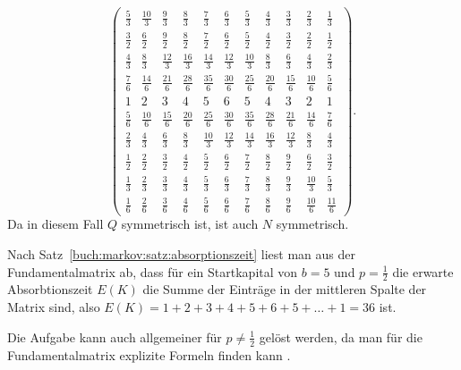 \begin{loesung}
\[\begin{pmatrix}
\frac{5}{3} &\frac{10}{3}&\frac{9}{3}&\frac{8}{3}&\frac{7}{3}&\frac{6}{3}&\frac{5}{3}&\frac{4}{3}&\frac{3}{3}&\frac{2}{3}&\frac{1}{3}\\
\frac{3}{2} & \frac{6}{2} & \frac{9}{2} & \frac{8}{2} & \frac{7}{2} & \frac{6}{2} & \frac{5}{2} & \frac{4}{2} & \frac{3}{2} & \frac{2}{2} & \frac{1}{2} \\
\frac{4}{3}&\frac{8}{3}&\frac{12}{3}& \frac{16}{3}& \frac{14}{3}& \frac{12}{3}& \frac{10}{3}& \frac{8}{3}& \frac{6}{3}& \frac{4}{3}& \frac{2}{3}\\
\frac{7}{6}& \frac{14}{6}& \frac{21}{6}& \frac{28}{6}& \frac{35}{6}& \frac{30}{6}& \frac{25}{6}& \frac{20}{6}& \frac{15}{6}& \frac{10}{6}& \frac{5}{6}\\
1&2&3&4&5&6&5&4&3&2&1\\
\frac{5}{6}& \frac{10}{6}& \frac{15}{6}& \frac{20}{6}& \frac{25}{6}& \frac{30}{6}& \frac{35}{6}& \frac{28}{6}& \frac{21}{6}& \frac{14}{6}& \frac{7}{6}\\
\frac{2}{3}& \frac{4}{3}& \frac{6}{3}& \frac{8}{3}& \frac{10}{3}& \frac{12}{3}& \frac{14}{3}& \frac{16}{3}& \frac{12}{3}& \frac{8}{3}& \frac{4}{3}\\
\frac{1}{2}& \frac{2}{2}& \frac{3}{2}& \frac{4}{2}& \frac{5}{2}& \frac{6}{2}& \frac{7}{2}& \frac{8}{2}& \frac{9}{2}& \frac{6}{2}& \frac{3}{2}\\
\frac{1}{3}& \frac{2}{3}& \frac{3}{3}& \frac{4}{3}& \frac{5}{3}& \frac{6}{3}& \frac{7}{3}& \frac{8}{3}& \frac{9}{3}& \frac{10}{3}& \frac{5}{3}\\
\frac{1}{6}& \frac{2}{6}& \frac{3}{6}& \frac{4}{6}& \frac{5}{6}& \frac{6}{6}& \frac{7}{6}& \frac{8}{6}& \frac{9}{6}& \frac{10}{6}& \frac{11}{6}
\end{pmatrix}.
\]
Da in diesem Fall $Q$ symmetrisch ist, ist auch $N$ symmetrisch.

Nach Satz~\ref{buch:markov:satz:absorptionszeit}
liest man aus der Fundamentalmatrix ab, dass
für ein Startkapital von $b=5$ und $p=\frac12$
die erwarte Absorbtionszeit $E(K)$ die Summe der Einträge in der mittleren Spalte
der Matrix sind, also $E(K)=1+2+3+4+5+6+5+\dots+1=36$ ist.
\end{loesung}

Die Aufgabe kann auch allgemeiner für $p\ne\frac12$ gelöst werden, da
man für die Fundamentalmatrix explizite Formeln finden kann \cite{skript:rudolph}.

